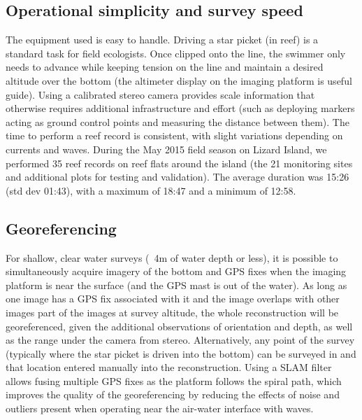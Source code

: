 \subsection{Operational simplicity and survey speed}
The equipment used is easy to handle. Driving a star picket (in reef) is a standard task for field ecologists. Once clipped onto the line, the swimmer only needs to advance while keeping tension on the line and maintain a desired altitude over the bottom (the altimeter display on the imaging platform is useful guide).
Using a calibrated stereo camera provides scale information that otherwise requires additional infrastructure and effort (such as deploying markers acting as ground control points and measuring the distance between them). 
The time to perform a reef record is consistent, with slight variations depending on currents and waves. During the May 2015 field season on Lizard Island, we performed 35 reef records on reef flats around the island (the 21 monitoring sites and additional plots for testing and validation). The average duration was 15:26 (std dev 01:43), with a maximum of 18:47 and a minimum of 12:58. 





\subsection{Georeferencing}
For shallow, clear water surveys (~4m of water depth or less), it is possible to simultaneously acquire imagery of the bottom and GPS fixes when the imaging platform is near the surface (and the GPS mast is out of the water). As long as one image has a GPS fix associated with it and the image overlaps with other images part of the images at survey altitude, the whole reconstruction will be georeferenced, given the additional observations of orientation and depth, as well as the range under the camera from stereo. Alternatively, any point of the survey (typically where the star picket is driven into the bottom) can be surveyed in and that location entered manually into the reconstruction. Using a SLAM filter allows fusing multiple GPS fixes as the platform follows the spiral path, which improves the quality of the georeferencing by reducing the effects of noise and outliers present when operating near the air-water interface with waves.


